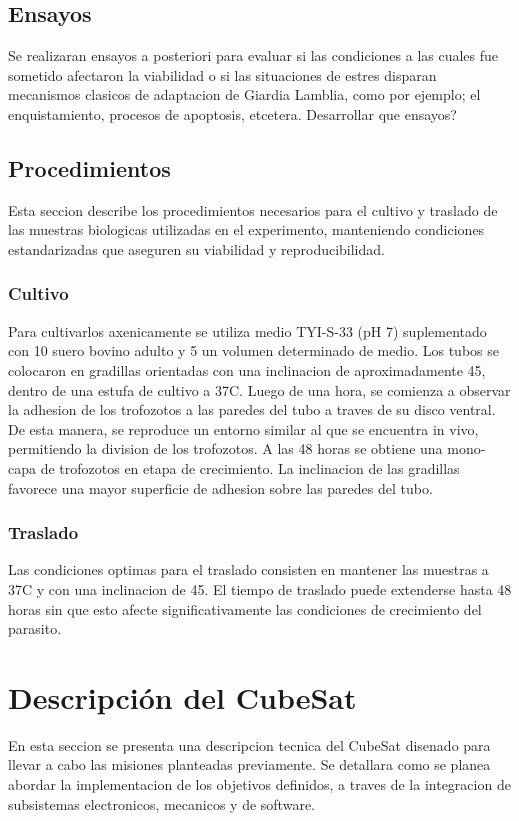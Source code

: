   \subsection{Ensayos}
    Se realizaran ensayos a posteriori para evaluar si las condiciones a las cuales fue sometido afectaron la viabilidad o si las situaciones de estres disparan mecanismos clasicos de
    adaptacion de Giardia Lamblia, como por ejemplo; el enquistamiento, procesos de apoptosis,
    etcetera. Desarrollar que ensayos?

  \subsection{Procedimientos}
    Esta seccion describe los procedimientos necesarios para el cultivo y traslado de las muestras
    biologicas utilizadas en el experimento, manteniendo condiciones estandarizadas que
    aseguren su viabilidad y reproducibilidad.
    \subsubsection{Cultivo}
    Para cultivarlos axenicamente se utiliza medio TYI-S-33 (pH 7) suplementado con 10%
    suero bovino adulto y 5%
    un volumen determinado de medio. Los tubos se colocaron en gradillas orientadas con una
    inclinacion de aproximadamente 45, dentro de una estufa de cultivo a 37C.
    Luego de una hora, se comienza a observar la adhesion de los trofozotos a las paredes del
    tubo a traves de su disco ventral. De esta manera, se reproduce un entorno similar al que se
    encuentra in vivo, permitiendo la division de los trofozotos. A las 48 horas se obtiene una
    mono-capa de trofozotos en etapa de crecimiento. La inclinacion de las gradillas favorece
    una mayor superficie de adhesion sobre las paredes del tubo.
    \subsubsection{Traslado}
    Las condiciones optimas para el traslado consisten en mantener las muestras a 37C y con
    una inclinacion de 45. El tiempo de traslado puede extenderse hasta 48 horas sin que esto
    afecte significativamente las condiciones de crecimiento del parasito.

\section{Descripción del CubeSat}
En esta seccion se presenta una descripcion tecnica del CubeSat disenado para llevar a
cabo las misiones planteadas previamente. Se detallara como se planea abordar la implementacion de
los objetivos definidos, a traves de la integracion de subsistemas electronicos, mecanicos y de software.

